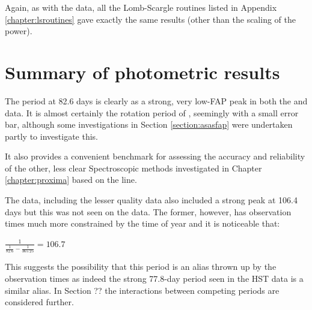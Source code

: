 Again, as with the {\asas} data, all the Lomb-Scargle routines listed in Appendix \ref{chapter:lsroutines} gave exactly
the same results (other than the scaling of the power).

\section{Summary of photometric results}
\protect\label{section:summphotometric}

The period at 82.6 days is clearly as a strong, very low-FAP peak in both the {\asas} and {\hst} data. It is almost
certainly the rotation period of {\prox}, seemingly with a small error bar, although some investigations in Section
\ref{section:asasfap} were undertaken partly to investigate this.

It also provides a convenient benchmark for assessing the accuracy and reliability of the other, less clear
Spectroscopic methods investigated in Chapter \ref{chapter:proxima} based on the {\ha} line.

The {\asas} data, including the lesser quality data also included a strong peak at 106.4 days but this was not seen on
the {\hst} data. The former, however, has observation times much more constrained by the time of year and it is
noticeable that:

\begin{center}

$ \frac{1}{\frac{1}{82.6} - \frac{1}{365.25}} = 106.7 $

\end{center}

This suggests the possibility that this period is an alias thrown up by the observation times as indeed the strong
77.8-day period seen in the HST data is a similar alias. In Section ?? the interactions between competing periods are
considered further.